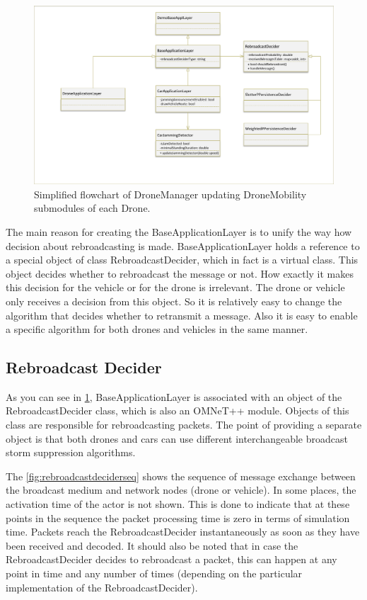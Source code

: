 \documentclass[]{nsm-thesis}
\begin{document}
\begin{figure}
	\centering
	\includegraphics[width=1\textwidth]{figures/BaseApplicationLayer.pdf}
	\caption{Simplified flowchart of DroneManager updating DroneMobility submodules of each Drone.}
	\label{fig:baseapplicationlayer}
\end{figure}

The main reason for creating the BaseApplicationLayer is to unify the way how decision about rebroadcasting is made. BaseApplicationLayer holds a reference to a special object of class RebroadcastDecider, which in fact is a virtual class. This object decides whether to rebroadcast the message or not. How exactly it makes this decision for the vehicle or for the drone is irrelevant. The drone or vehicle only receives a decision from this object. So it is relatively easy to change the algorithm that decides whether to retransmit a message. Also it is easy to enable a specific algorithm for both drones and vehicles in the same manner.



\subsection {Rebroadcast Decider}

As you can see in \cref{fig:baseapplicationlayer}, BaseApplicationLayer is associated with an object of the RebroadcastDecider class, which is also an OMNeT++ module. Objects of this class are responsible for rebroadcasting packets. The point of providing a separate object is that both drones and cars can use different interchangeable broadcast storm suppression algorithms. 

The \cref{fig:rebroadcastdeciderseq} shows the sequence of message exchange between the broadcast medium and network nodes (drone or vehicle). In some places, the activation time of the actor is not shown. This is done to indicate that at these points in the sequence the packet processing time is zero in terms of simulation time. Packets reach the RebroadcastDecider instantaneously as soon as they have been received and decoded. It should also be noted that in case the RebroadcastDecider decides to rebroadcast a packet, this can happen at any point in time and any number of times (depending on the particular implementation of the RebroadcastDecider).
\end{document}
